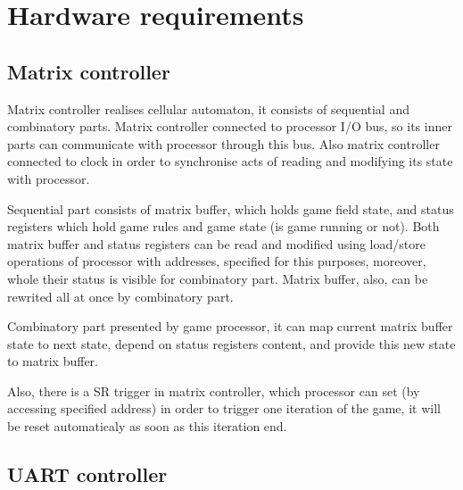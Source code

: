 \chapter*{Hardware requirements}

\section*{Matrix controller}

Matrix controller realises cellular automaton, it consists of sequential and combinatory parts. Matrix controller connected to processor I/O bus, so its inner parts can communicate with processor through this bus. Also matrix controller connected to clock in order to synchronise acts of reading and modifying its state with processor.

Sequential part consists of matrix buffer, which holds game field state, and status registers  which hold game rules and game state (is game running or not). Both matrix buffer and status registers can be read and modified using load/store operations of processor with addresses, specified for this purposes, moreover, whole their status is visible for combinatory part. Matrix buffer, also, can be rewrited all at once by combinatory part.

Combinatory part presented by game processor, it can map current matrix buffer state to next state, depend on status registers content, and provide this new state to matrix buffer.

Also, there is a SR trigger in matrix controller, which processor can set (by accessing specified address) in order to trigger one iteration of the game, it will be reset automaticaly as soon as this iteration end.


\section*{UART controller}
